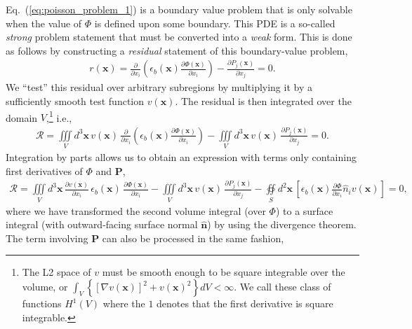 \documentclass[22pt]{article} %
\begin{document}
%
Eq.~(\ref{eq:poisson_problem_1}) is a boundary value problem that is only solvable when the value of $\Phi$ is defined upon some boundary. 
%
This PDE is a so-called \emph{strong} problem statement that must be converted into a \emph{weak} form.
%
This is done as follows by constructing a \emph{residual} statement of this boundary-value problem,
%
\begin{align}\label{eq:poisson_problem_2}
r(\textbf{x}) = \frac{\partial}{\partial x_i} \left(\epsilon_b(\textbf{x}) \frac{\partial \Phi(\textbf{x})}{\partial x_i}\right) - \frac{\partial P_j(\textbf{x})}{\partial x_j} = 0.
\end{align}
%
We ``test'' this residual over arbitrary subregions by multiplying it by a sufficiently smooth test function $v(\textbf{x})$.
%
The residual is then integrated over the domain $V$,\footnote[5]{The L2 space of $v$ must be smooth enough to be square integrable over the volume, or $\int_V \left\{[\nabla v(\textbf{x})]^2 + v(\textbf{x})^2 \right\} dV < \infty$.
%
We call these class of functions $H^1(V)$ where the $1$ denotes that the first derivative is square integrable.} i.e.,
%
\begin{align}\label{eq:poisson_problem_3}
\mathscr{R} = \iiint\limits_V d^3 \textbf{x} \, v(\textbf{x})\,\frac{\partial}{\partial x_i} \left(\epsilon_b(\textbf{x}) \frac{\partial \Phi(\textbf{x})}{\partial x_i}\right) - \iiint\limits_V d^3 \textbf{x} \, v(\textbf{x})\, \frac{\partial P_j(\textbf{x})}{\partial x_j} = 0.
\end{align}
%
Integration by parts allows us to obtain an expression with terms only containing first derivatives of $\Phi$ and $\textbf{P}$, 
%
\begin{align}\label{eq:poisson_problem_4}
\mathscr{R} = \iiint\limits_V d^3 \textbf{x} \, \frac{\partial v(\textbf{x})}{\partial x_i} \, \epsilon_b(\textbf{x}) \, \frac{\partial \Phi(\textbf{x})}{\partial x_i} - \iiint\limits_V d^3 \textbf{x} \, v(\textbf{x})\, \frac{\partial P_j(\textbf{x})}{\partial x_j} - \oiint\limits_S d^2 \textbf{x} \, \left[\epsilon_b(\textbf{x}) \frac{\partial \Phi}{\partial x_i} \hat{n}_i v(\textbf{x})\right] = 0,
\end{align}
%
where we have transformed the second volume integral (over $\Phi$) to a surface integral (with outward-facing surface normal $\hat{\textbf{n}}$) by using the divergence theorem. 
%
The term involving $\textbf{P}$ can also be processed in the same fashion, %
\end{document}
